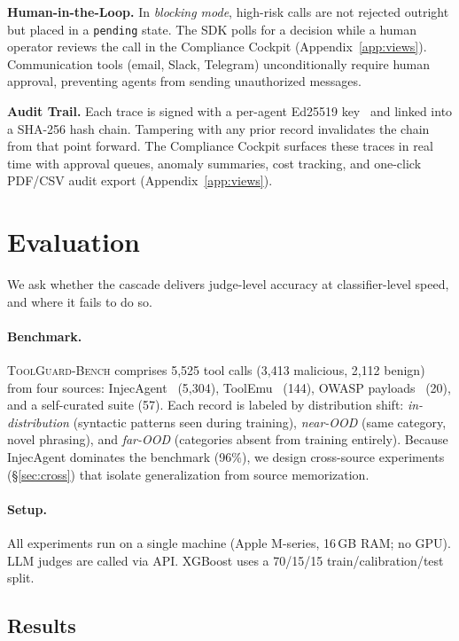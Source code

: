 \documentclass[sigconf]{acmart}
\newcommand{\bench}{\textsc{ToolGuard-Bench}\xspace}
\begin{document}
\noindent\textbf{Human-in-the-Loop.}
In \emph{blocking mode}, high-risk calls are not rejected outright but placed in a \texttt{pending} state.
The SDK polls for a decision while a human operator reviews the call in the Compliance Cockpit (Appendix~\ref{app:views}).
Communication tools (email, Slack, Telegram) unconditionally require human approval, preventing agents from sending unauthorized messages.

\noindent\textbf{Audit Trail.}
Each trace is signed with a per-agent Ed25519 key~\cite{bernstein2012eddsa} and linked into a SHA-256 hash chain.
Tampering with any prior record invalidates the chain from that point forward.
The Compliance Cockpit surfaces these traces in real time with approval queues, anomaly summaries, cost tracking, and one-click PDF/CSV audit export (Appendix~\ref{app:views}).

\section{Evaluation}
\label{sec:eval}

We ask whether the cascade delivers judge-level accuracy at classifier-level speed, and where it fails to do so.

\paragraph{Benchmark.}
\bench comprises 5{,}525 tool calls (3{,}413 malicious, 2{,}112 benign) from four sources: InjecAgent~\cite{zhan2024injecagent} (5{,}304), ToolEmu~\cite{ruan2024toolemu} (144), OWASP payloads~\cite{owasp2025} (20), and a self-curated suite (57). Each record is labeled by distribution shift: \emph{in-distribution} (syntactic patterns seen during training), \emph{near-OOD} (same category, novel phrasing), and \emph{far-OOD} (categories absent from training entirely).
Because InjecAgent dominates the benchmark (96\%), we design cross-source experiments (\S\ref{sec:cross}) that isolate generalization from source memorization.

\paragraph{Setup.}
All experiments run on a single machine (Apple M-series, 16\,GB RAM; no GPU). LLM judges are called via API. XGBoost uses a 70/15/15 train/calibration/test split.

\subsection{Results}
\end{document}

